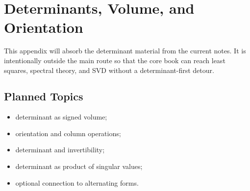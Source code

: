 \chapter{Determinants, Volume, and Orientation}
\label{app:determinants}

\begin{draftbox}
This appendix will absorb the determinant material from the current notes. It
is intentionally outside the main route so that the core book can reach least
squares, spectral theory, and SVD without a determinant-first detour.
\end{draftbox}

\section{Planned Topics}

\begin{itemize}
  \item determinant as signed volume;
  \item orientation and column operations;
  \item determinant and invertibility;
  \item determinant as product of singular values;
  \item optional connection to alternating forms.
\end{itemize}
